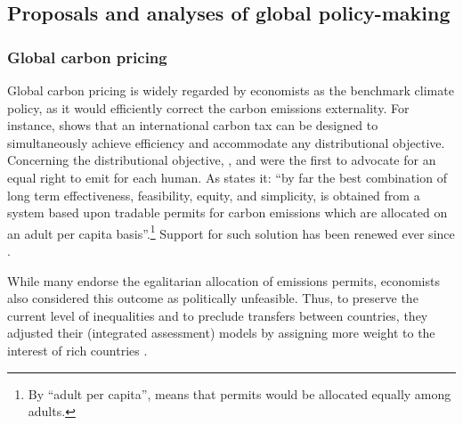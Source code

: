 \documentclass[12pt,english]{article}
\begin{document}
\subsection{Proposals and analyses of global policy-making}\label{subsec:literature_policies}

\subsubsection{Global carbon pricing}\label{subsubsec:literature_pricing}

Global carbon pricing is widely regarded by economists as the benchmark climate policy, as it would efficiently correct the carbon emissions externality. For instance, \citet{hoel_carbon_1991} shows that an international carbon tax can be designed to simultaneously achieve efficiency and accommodate any distributional objective. 
Concerning the distributional objective, \citet{grubb_greenhouse_1990}, \citet{agarwal_global_1991} and \citet{bertram_tradeable_1992} were the first to advocate for an equal right to emit for each human. As \citet{grubb_greenhouse_1990} states it: ``by far the best combination of long term effectiveness, feasibility, equity, and simplicity, is obtained from a system based upon tradable permits for carbon emissions which are allocated on an adult per capita basis''.\footnote{By ``adult per capita'', \citet{grubb_greenhouse_1990} means that permits would be allocated equally among adults.} Support for such solution has been renewed ever since \citep{baer_equity_2000,jamieson_climate_2001,blanchard_major_2021,rajan_global_2021}. %

While many endorse the egalitarian allocation of emissions permits, economists also considered this outcome as politically unfeasible. Thus, to preserve the current level of inequalities and to preclude transfers between countries, they adjusted their (integrated assessment) models by assigning more weight to the interest of rich countries \citep{stanton_negishi_2011}.  %
\end{document}
